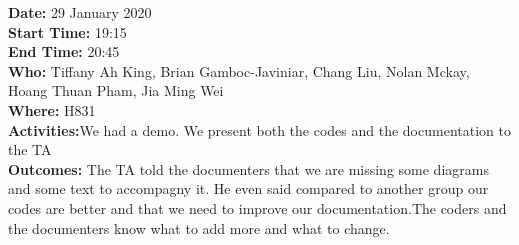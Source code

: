 \documentclass[12pt]{article}
\begin{document}
{\bf Date:} 29 January 2020\\
{\bf Start Time:} 19:15\\
{\bf End Time:} 20:45\\
{\bf Who:} Tiffany Ah King, Brian Gamboc-Javiniar,
Chang Liu, Nolan Mckay, Hoang Thuan Pham, Jia Ming Wei\\
{\bf Where:} H831\\
{\bf Activities:}We  had a demo. We present both the codes and the documentation to the TA\\
{\bf Outcomes:} The TA told the documenters that we are missing some diagrams and some text to accompagny it. He even said compared to another group our codes are better and that we need to improve our documentation.The coders and the documenters know what to add more and what to change.\\

\end{document}
